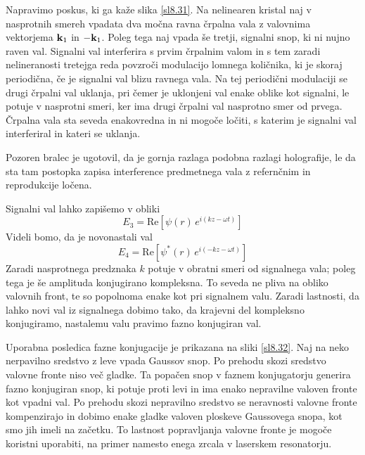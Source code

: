 Napravimo poskus, ki ga kaže slika \ref{sl8.31}. Na nelinearen kristal
naj v nasprotnih smereh vpadata dva močna ravna črpalna vala z valovnima
vektorjema ${\bf k}_{1}$ in $-{\bf k}_{1}$. Poleg tega naj vpada
še tretji, signalni snop, ki ni nujno raven val. Signalni val interferira
s prvim črpalnim valom in s tem zaradi nelineranosti tretejga reda
povzroči modulacijo lomnega količnika, ki je skoraj periodična, če
je signalni val blizu ravnega vala. Na tej periodični modulaciji se
drugi črpalni val uklanja, pri čemer je uklonjeni val enake oblike
kot signalni, le potuje v nasprotni smeri, ker ima drugi črpalni val
nasprotno smer od prvega. Črpalna vala sta seveda enakovredna in ni
mogoče ločiti, s katerim je signalni val interferiral in kateri se
uklanja.

Pozoren bralec je ugotovil, da je gornja razlaga podobna razlagi holografije,
le da sta tam postopka zapisa interference predmetnega vala z refernčnim
in reprodukcije ločena.

Signalni val lahko zapišemo v obliki 
\begin{equation}
E_{3}=\mathrm{Re}\left[\psi\left(r\right)\, e^{i\left(kz-\omega t\right)}\right]\label{8.97}
\end{equation}
 Videli bomo, da je novonastali val 
\begin{equation}
E_{4}=\mathrm{Re}\left[\psi^{*}\left(r\right)\, e^{i\left(-kz-\omega t\right)}\right]\label{8.98}
\end{equation}
 Zaradi nasprotnega predznaka $k$ potuje v obratni smeri od signalnega
vala; poleg tega je še amplituda konjugirano kompleksna. To seveda
ne pliva na obliko valovnih front, te so popolnoma enake kot pri signalnem
valu. Zaradi lastnosti, da lahko novi val iz signalnega dobimo tako,
da krajevni del kompleksno konjugiramo, nastalemu valu pravimo fazno
konjugiran val.

Uporabna posledica fazne konjugacije je prikazana na sliki \ref{sl8.32}.
Naj na neko nerpavilno sredstvo z leve vpada Gaussov snop. Po prehodu
skozi sredstvo valovne fronte niso več gladke. Ta popačen snop v faznem
konjugatorju generira fazno konjugiran snop, ki potuje proti levi
in ima enako nepravilne valoven fronte kot vpadni val. Po prehodu
skozi nepravilno sredstvo se neravnosti valovne fronte kompenzirajo
in dobimo enake gladke valoven ploskeve Gaussovega snopa, kot smo
jih imeli na začetku. To lastnost popravljanja valovne fronte je mogoče
koristni uporabiti, na primer namesto enega zrcala v laserskem resonatorju.

